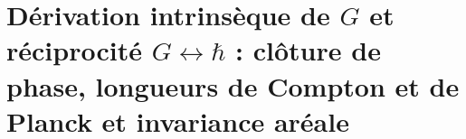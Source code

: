 \chapter{Dérivation intrinsèque de \(G\) et réciprocité \(G\leftrightarrow\hbar\) : clôture de phase, longueurs de Compton et de Planck et invariance aréale}
\label{chap:p3-final:50:gravitacion_accion}



